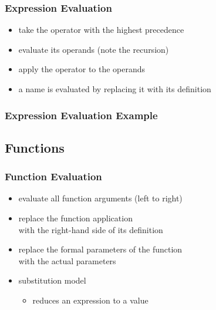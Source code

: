 \documentclass[dvipsnames]{beamer}
\theoremstyle{plain}
\begin{document}
\begin{frame}
  \frametitle{Expression Evaluation}

  \begin{itemize}
    \item take the operator with the highest precedence
    \item evaluate its operands (note the recursion)
    \item apply the operator to the operands

    \pause
    \medskip
    \item a name is evaluated by replacing it with its definition
  \end{itemize}
\end{frame}

\begin{frame}
  \frametitle{Expression Evaluation Example}

  \begin{example}

    \pause
    \medskip

    \pause
    \medskip

    \pause
    \medskip
  \end{example}
\end{frame}

\subsection{Functions}

\begin{frame}
  \frametitle{Function Evaluation}

  \begin{itemize}
    \item evaluate all function arguments (left to right)
    \item replace the function application\\
      with the right-hand side of its definition
    \item replace the formal parameters of the function\\
      with the actual parameters

    \pause
    \bigskip
    \item \alert{substitution model}
    \begin{itemize}
      \item reduces an expression to a value
    \end{itemize}
  \end{itemize}
\end{frame}
\end{document}
